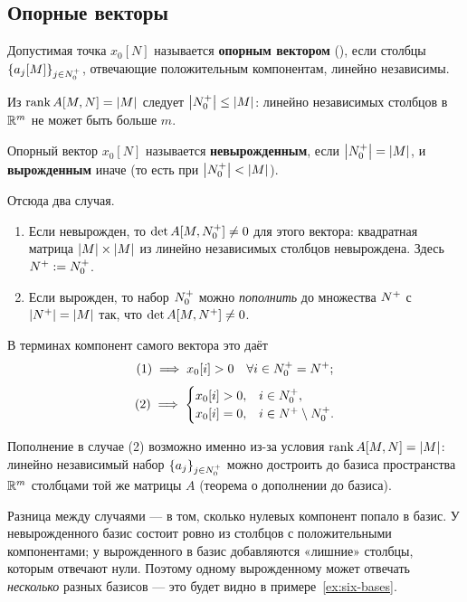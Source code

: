 \subsection{Опорные векторы}

\begin{definition}\label{def:support-vector}
Допустимая точка $x_0[N]$ называется \textbf{опорным вектором} (\ov), если столбцы
$\{a_j[M]\}_{j \in N_0^{+}}$, отвечающие положительным компонентам, линейно независимы.
\end{definition}

\begin{remark}
Из $\operatorname{rank} A[M,N] = \left\lvert M \right\rvert$ следует $\left\lvert N_0^{+} \right\rvert \le \left\lvert M \right\rvert$: линейно независимых
столбцов в $\mathbb{R}^{m}$ не может быть больше $m$.
\end{remark}

\begin{definition}\label{def:degenerate}
Опорный вектор $x_0[N]$ называется \textbf{невырожденным}, если $\left\lvert N_0^{+} \right\rvert = \left\lvert M \right\rvert$,
и \textbf{вырожденным} иначе (то есть при $\left\lvert N_0^{+} \right\rvert < \left\lvert M \right\rvert$).
\end{definition}

Отсюда два случая.

\begin{enumerate}[label=(\arabic*),left=0pt]
  \item Если \ov{} невырожден, то $\det A[M, N_0^{+}] \ne 0$ для этого вектора:
        квадратная матрица $\left\lvert M \right\rvert \times \left\lvert M \right\rvert$ из линейно независимых столбцов
        невырождена. Здесь $N^{+} := N_0^{+}$.
  \item Если \ov{} вырожден, то набор $N_0^{+}$ можно \emph{пополнить} до множества $N^{+}$
        с $\left\lvert N^{+} \right\rvert = \left\lvert M \right\rvert$ так, что $\det A[M, N^{+}] \ne 0$.
\end{enumerate}

В терминах компонент самого вектора это даёт
\[
  (1) \implies x_0[i] > 0 \quad \forall i \in N_0^{+} = N^{+} ;
\]
\[
  (2) \implies
  \begin{cases}
    x_0[i] > 0, & i \in N_0^{+}, \\
    x_0[i] = 0, & i \in N^{+} \setminus N_0^{+} .
  \end{cases}
\]

\begin{idea}
Пополнение в случае (2) возможно именно из-за условия $\operatorname{rank} A[M,N] = \left\lvert M \right\rvert$:
линейно независимый набор $\{a_j\}_{j \in N_0^{+}}$ можно достроить до базиса
пространства $\mathbb{R}^{m}$ столбцами той же матрицы $A$ (теорема о дополнении до базиса).

Разница между случаями — в том, сколько нулевых компонент попало в базис. У
невырожденного \ov{} базис состоит ровно из столбцов с положительными компонентами;
у вырожденного в базис добавляются «лишние» столбцы, которым отвечают нули. Поэтому
одному вырожденному \ov{} может отвечать \emph{несколько} разных базисов — это будет
видно в примере~\ref{ex:six-bases}.
\end{idea}

